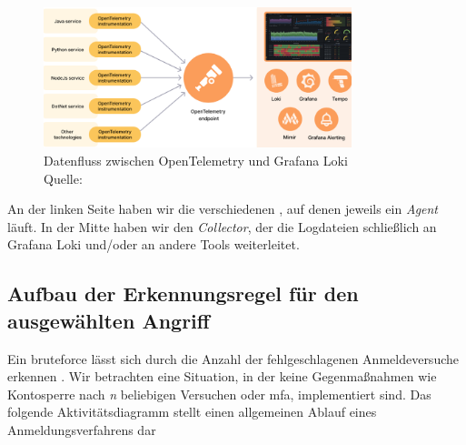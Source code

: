 

\begin{figure}[H]
   \centering
   \includegraphics[width=0.8\textwidth]{assets/Grafana_OpenTelemtry.png}
   \caption{Datenfluss zwischen OpenTelemetry und Grafana Loki\\Quelle: \citep{Grafana_WhatOpentelemetry}}
   \centering
\end{figure}

An der linken Seite haben wir die verschiedenen , auf denen jeweils ein \textit{Agent} läuft. In der Mitte haben wir den \textit{Collector}, der die Logdateien schließlich an Grafana Loki und/oder an andere Tools weiterleitet.



\newpage
\subsection{Aufbau der Erkennungsregel für den ausgewählten Angriff}
Ein \gls{bruteforce} lässt sich durch die Anzahl der fehlgeschlagenen Anmeldeversuche erkennen \citep{Selvaganesh_SplunkBruteForce}. Wir betrachten eine Situation, in der keine Gegenmaßnahmen wie Kontosperre nach \textit{n} beliebigen Versuchen oder \gls{mfa}, implementiert sind. Das folgende Aktivitätsdiagramm stellt einen allgemeinen Ablauf eines Anmeldungsverfahrens dar

